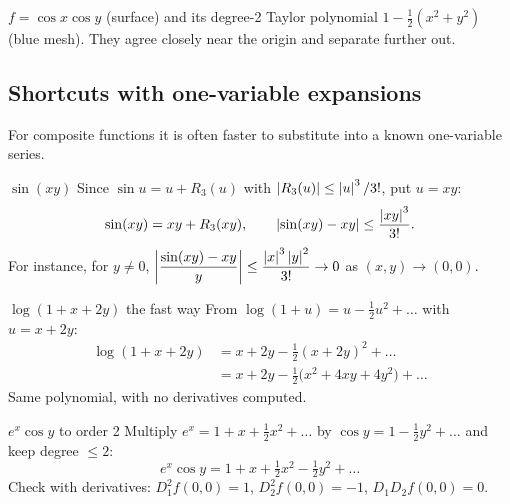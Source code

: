 \begin{center}

{\small\color{navy} $f=\cos x\cos y$ (surface) and its degree-2 Taylor polynomial
$1-\tfrac12(x^2+y^2)$ (blue mesh). They agree closely near the origin and separate further out.}
\end{center}

\subsection{Shortcuts with one-variable expansions}

For composite functions it is often faster to substitute into a known one-variable series.

\begin{example}{$\sin(xy)$}
Since $\sin u=u+R_3(u)$ with $\left\lvert R_3(u)\right\rvert\le\left\lvert u\right\rvert^3/3!$, put $u=xy$:
\[ \sin(xy)=xy+R_3(xy),\qquad \left\lvert \sin(xy)-xy\right\rvert\le\frac{\left\lvert xy\right\rvert^3}{3!}. \]
For instance, for $y\neq0$,
$\left\lvert \dfrac{\sin(xy)-xy}{y}\right\rvert\le\dfrac{\left\lvert x\right\rvert^3\left\lvert y\right\rvert^2}{3!}\to0$ as $(x,y)\to(0,0)$.
\end{example}

\begin{example}{$\log(1+x+2y)$ the fast way}
From $\log(1+u)=u-\tfrac12u^2+\dots$ with $u=x+2y$:
\begin{align*}\log(1+x+2y)&=x+2y-\tfrac12(x+2y)^2+\dots\\&=x+2y-\tfrac12\big(x^2+4xy+4y^2\big)+\dots\end{align*}
Same polynomial, with no derivatives computed.
\end{example}

\begin{example}{$e^x\cos y$ to order 2}
Multiply $e^x=1+x+\tfrac12x^2+\dots$ by $\cos y=1-\tfrac12y^2+\dots$ and keep degree $\le2$:
\[ e^x\cos y=1+x+\tfrac12x^2-\tfrac12y^2+\dots \]
Check with derivatives: $D_1^2f(0,0)=1$, $D_2^2f(0,0)=-1$, $D_1D_2f(0,0)=0$.
\end{example}

